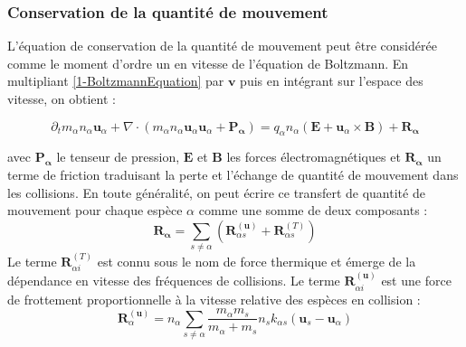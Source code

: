\begin{refsection}
\subsubsection{Conservation de la quantité de mouvement}
L'équation de conservation de la quantité de mouvement peut être considérée
comme le moment d'ordre un en vitesse de l'équation de Boltzmann. En multipliant
\eqref{1-BoltzmannEquation} par $\mathbf v$ puis en intégrant sur l'espace des
vitesse, on obtient :

\begin{equation}
\label{1-eqQuantiteMouvement}
\partial_t m_\alpha n_\alpha \mathbf{u}_\alpha + 
\nabla\cdot\left(m_\alpha n_\alpha
\mathbf{u}_\alpha\mathbf{u}_\alpha+\mathbf{P_\alpha}\right)=q_\alpha
n_\alpha\left(\mathbf E+\mathbf u_\alpha\times\mathbf B\right)
+\mathbf{R_\alpha}
\end{equation}

avec $\mathbf{P_\alpha}$ le tenseur de pression, $\mathbf{E}$ et $\mathbf{B}$
les forces électromagnétiques et $\mathbf{R_\alpha}$ un terme de
friction traduisant la perte et l'échange de quantité de mouvement dans les
collisions. En toute généralité, on peut écrire ce transfert de quantité de
mouvement pour chaque espèce $\alpha$ comme une somme de deux composants :
\begin{equation}
\mathbf{R_\alpha}=\sum_{s\neq\alpha}(\mathbf{R}_{\alpha s}^{(\mathbf
u)}+\mathbf{R}_{\alpha s}^{(T)})
\end{equation}
Le terme
$\mathbf{R}_{\alpha i}^{(T)}$ est connu sous le nom de force thermique et
émerge de la dépendance en vitesse des fréquences de collisions. Le terme
$\mathbf{R}_{\alpha i}^{(\mathbf u)}$ est une force de frottement
proportionnelle à la vitesse relative des espèces en collision :
\begin{equation}
\mathbf{R}_{\alpha}^{(\mathbf
u)}=n_\alpha\sum_{s\neq\alpha}\frac{m_\alpha m_s}{m_\alpha+m_s}
n_sk_{\alpha s} \left(\mathbf u_s-\mathbf u_\alpha\right)
\end{equation}


\end{refsection}
